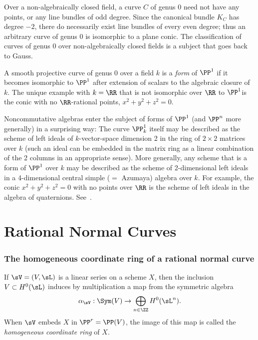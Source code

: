 \begin{fact}
Over a non-algebraically closed field, a curve $C$ of genus 0 need not have any points, or any line bundles of odd degree. Since the canonical bundle $K_C$ has degree $-2$, there do necessarily exist line bundles of every even degree; thus an arbitrary curve of genus 0 is isomorphic to a  plane conic. 
The classification of curves of genus 0 over non-algebraically closed fields is a subject that goes back to Gauss.

A smooth projective curve of genus 0 over a field $k$ is a \emph{form} of $\PP^1$ if it becomes isomorphic to $\PP^1$ after extension
of scalars to
the algebraic closure of $k$. The unique example with $k = \RR$ that is not isomorphic over $\RR$ to $\PP^1$is the conic with no $\RR$-rational points, $x^2+y^2+z^2 = 0$. 

Noncommutative algebras enter the subject of forms of $\PP^1$ (and $\PP^n$ more generally) in a surprising way: The curve $\PP_k^1$ itself may be described as the scheme of left ideals of $k$-vector-space dimension 2 in the ring of
$2\times 2$ matrices over $k$ (such an ideal can be embedded in the matrix ring as a linear combination of the 2 columns in an appropriate sense). More generally, any scheme that is a form of $\PP^1$ over $k$
may be described as the scheme of 2-dimensional left ideals in a 4-dimensional central simple ($=$ Azumaya) algebra over $k$. For example, the
conic $x^2+y^2+z^2 = 0$ with no points over $\RR$ is the scheme of left ideals in the algebra of quaternions. See~\cite[Section X.6]{Serre1979}.
\end{fact}

\section{Rational Normal Curves}\label{rational normal curves section}

\subsubsection{The homogeneous coordinate ring of a rational normal curve}

If $\sV = (V,\sL)$ is a linear series on a scheme $X$, then the inclusion
$V\subset H^0(\sL)$ induces by multiplication a map from the symmetric algebra
$$
\alpha_{\sV}: \Sym(V) \to  \bigoplus_{n\in \ZZ} H^0(\sL^n).
$$
When $\sV$ embeds $X$ in $\PP^r = \PP(V)$, the image of this map is called the \emph{homogeneous coordinate ring} of $X$. 

